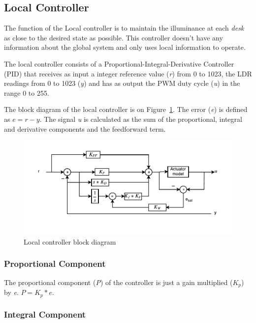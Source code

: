 \subsection{Local Controller}
\label{sec:LocalController}

The function of the Local controller is to maintain the illuminance at each \emph{desk} as close to the desired state as possible. This controller doesn't have any information about the global system and only uses local information to operate.

The local controller consists of a Proportional-Integral-Derivative Controller (PID) that receives as input a integer reference value (\emph{r}) from 0 to 1023, the LDR readings from 0 to 1023 (\emph{y}) and has as output the PWM duty cycle (\emph{u}) in the range 0 to 255.

The block diagram of the local controller is on Figure~\ref{fig:pid_block_diagram}. The error (\emph{e}) is defined as $e = r - y$. The signal \emph{u} is calculated as the sum of the proportional, integral and derivative components and the feedforward term.

\begin{figure}[!ht]
    \centering
        \includegraphics[width=\textwidth]{img/pid_block_diagram}
    \caption{Local controller block diagram}\label{fig:pid_block_diagram}
\end{figure}


\subsubsection{Proportional Component}
\label{sub:ProportionalComponent}

The proportional component (\emph{P}) of the controller is just a gain multiplied (\emph{$K_p$}) by \emph{e}. $ P = K_p * e$.

\subsubsection{Integral Component}
\label{sub:IntegralComponent}

